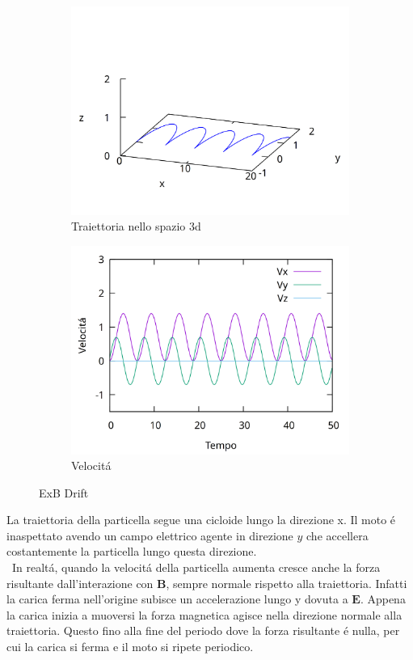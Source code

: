 \begin{figure}[ht]
\begin{subfigure}{.5\textwidth}
  \centering
  \includegraphics[width=.9\linewidth]{img/3dposizionedrift.png}  
  \caption{Traiettoria nello spazio 3d}
\end{subfigure}
\begin{subfigure}{.5\textwidth}
  \centering
  \includegraphics[width=.9\linewidth]{img/vdrift.png}  
  \caption{Velocitá }
\end{subfigure}
\caption{ExB Drift}
\end{figure}%
La traiettoria della particella segue una cicloide lungo la direzione x. Il moto é inaspettato avendo un campo elettrico agente in direzione $y$ che accellera costantemente la particella lungo questa direzione.\\\
In realtá, quando la velocitá della particella aumenta cresce anche la forza risultante dall'interazione con $\mathbf{B}$, sempre normale rispetto alla traiettoria.
Infatti la carica ferma nell'origine subisce un accelerazione lungo y dovuta a $\mathbf{E}$. Appena la carica inizia a muoversi la forza magnetica agisce nella direzione normale alla traiettoria. Questo fino alla fine del periodo dove la forza risultante é nulla, per cui la carica si ferma e il moto si ripete periodico.

